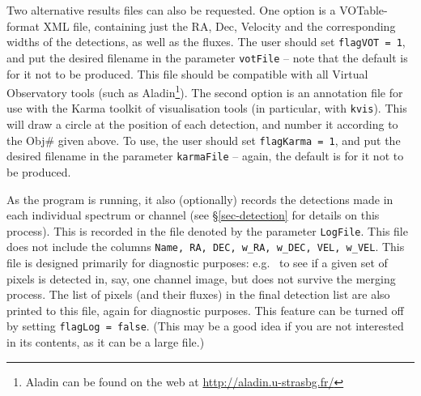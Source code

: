 \documentclass[12pt,a4paper]{article}
\newcommand{\eg}{e.g.\ }
\begin{document}
Two alternative results files can also be requested. One option is a
VOTable-format XML file, containing just the RA, Dec, Velocity and the
corresponding widths of the detections, as well as the fluxes. The
user should set {\tt flagVOT = 1}, and put the desired filename in the
parameter {\tt votFile} -- note that the default is for it not to be
produced. This file should be compatible with all Virtual Observatory
tools (such as Aladin\footnote{ Aladin can be found on the web at
\href{http://aladin.u-strasbg.fr/}{http://aladin.u-strasbg.fr/}}). The
second option is an annotation file for use with the Karma toolkit of
visualisation tools (in particular, with {\tt kvis}). This will draw a
circle at the position of each detection, and number it according to
the Obj\# given above. To use, the user should set {\tt flagKarma = 1},
and put the desired filename in the parameter {\tt karmaFile} -- again,
the default is for it not to be produced.

As the program is running, it also (optionally) records the detections
made in each individual spectrum or channel (see
\S\ref{sec-detection} for details on this process). This is
recorded in the file denoted by the parameter {\tt LogFile}. This file
does not include the columns {\tt Name, RA, DEC, w\_RA, w\_DEC, VEL,
w\_VEL}. This file is designed primarily for diagnostic purposes: \eg
to see if a given set of pixels is detected in, say, one channel
image, but does not survive the merging process. The list of pixels
(and their fluxes) in the final detection list are also printed to
this file, again for diagnostic purposes. This feature can be turned
off by setting {\tt flagLog = false}. (This may be a good idea if you
are not interested in its contents, as it can be a large file.)
\end{document}
